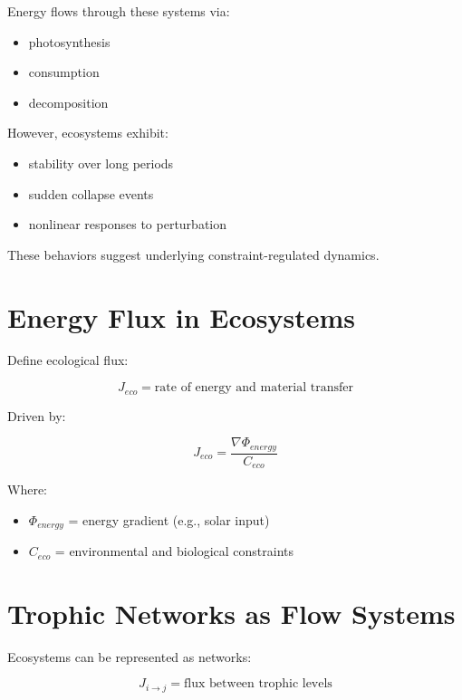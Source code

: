\documentclass[11pt]{article}
\begin{document}
Energy flows through these systems via:

\begin{itemize}
    \item photosynthesis
    \item consumption
    \item decomposition
\end{itemize}

However, ecosystems exhibit:

\begin{itemize}
    \item stability over long periods
    \item sudden collapse events
    \item nonlinear responses to perturbation
\end{itemize}

These behaviors suggest underlying constraint-regulated dynamics.

\section{Energy Flux in Ecosystems}

Define ecological flux:

\begin{equation}
J_{eco} = \text{rate of energy and material transfer}
\end{equation}

Driven by:

\begin{equation}
J_{eco} = \frac{\nabla \Phi_{energy}}{C_{eco}}
\end{equation}

Where:

\begin{itemize}
    \item $\Phi_{energy}$ = energy gradient (e.g., solar input)
    \item $C_{eco}$ = environmental and biological constraints
\end{itemize}

\section{Trophic Networks as Flow Systems}

Ecosystems can be represented as networks:

\begin{equation}
J_{i \rightarrow j} = \text{flux between trophic levels}
\end{equation}
\end{document}
